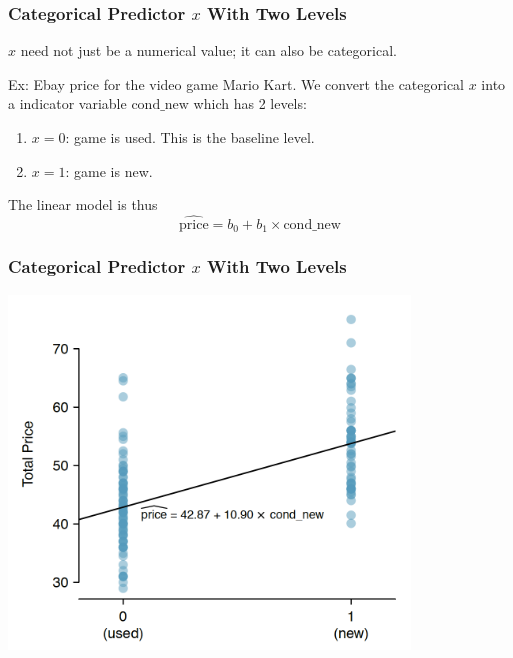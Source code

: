 \documentclass[slides]{beamer}
\newcommand{\blue}[1]{\textcolor{blue2}{#1}}
\begin{document}
\begin{frame}[fragile]
\frametitle{Categorical Predictor $x$ With Two Levels}
$x$ need not just be a numerical value; it can also be categorical.  

\vspace{0.25cm}
\pause
Ex: Ebay price for the video game Mario Kart. We convert the categorical $x$ into a \blue{indicator variable} $\mbox{cond\_new}$ which has 2 \blue{levels}:
\begin{enumerate}
\item $x=0$:  game is used. This is the \blue{baseline} level.
\item $x=1$:  game is new.
\end{enumerate}
\pause
The linear model is thus
\[
\widehat{\mbox{price}} = b_0 + b_1 \times \mbox{cond\_new}
\]

\end{frame}


\begin{frame}[fragile]
\frametitle{Categorical Predictor $x$ With Two Levels}

\begin{center}
\includegraphics[width=0.8\textwidth]{figure/mario_kart.png}
\end{center}

\end{frame}
\end{document}
